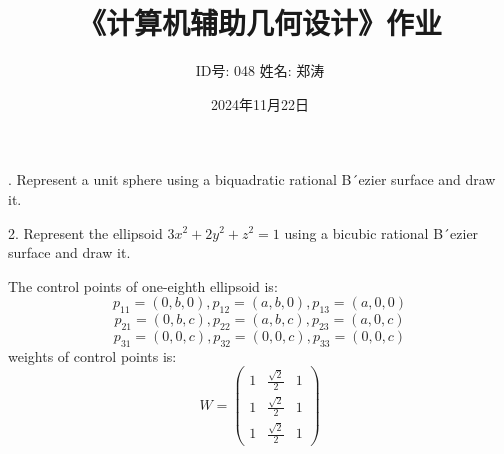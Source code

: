 \documentclass{article}
\begin{document}
	
	\title{《计算机辅助几何设计》作业}
	\author{ID号: 048  \qquad  姓名: 郑涛}  %
	\date{2024年11月22日}
	. Represent a unit sphere using a biquadratic rational B´ezier surface and draw it.
	
	2. Represent the ellipsoid $3x^2+2y^2+z^2=1$ using a bicubic rational B´ezier surface and draw
	it.
	
	The control points of one-eighth ellipsoid is:
	 $$p_{11}=(0,b,0),p_{12}=(a,b,0),p_{13}=(a,0,0)$$
	 $$p_{21}=(0,b,c),p_{22}=(a,b,c),p_{23}=(a,0,c)$$
	 $$p_{31}=(0,0,c),p_{32}=(0,0,c),p_{33}=(0,0,c)$$
	 weights of control points is:
	 \begin{equation*}
	 	W = \left(
	 	\begin{matrix}
	 		1&\frac{\sqrt{2}}{2}& 1\\
	 		1&\frac{\sqrt{2}}{2}& 1\\
	 		1&\frac{\sqrt{2}}{2}& 1
	 	\end{matrix}
	 	\right)
	 \end{equation*}
	
\end{document}
